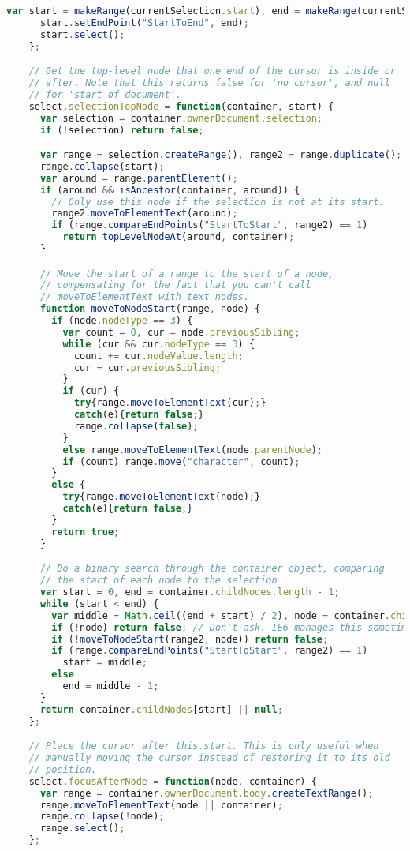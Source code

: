 \begin{lstlisting}[language=Javascript]
      var start = makeRange(currentSelection.start), end = makeRange(currentSelection.end);
      start.setEndPoint("StartToEnd", end);
      start.select();
    };

    // Get the top-level node that one end of the cursor is inside or
    // after. Note that this returns false for 'no cursor', and null
    // for 'start of document'.
    select.selectionTopNode = function(container, start) {
      var selection = container.ownerDocument.selection;
      if (!selection) return false;

      var range = selection.createRange(), range2 = range.duplicate();
      range.collapse(start);
      var around = range.parentElement();
      if (around && isAncestor(container, around)) {
        // Only use this node if the selection is not at its start.
        range2.moveToElementText(around);
        if (range.compareEndPoints("StartToStart", range2) == 1)
          return topLevelNodeAt(around, container);
      }

      // Move the start of a range to the start of a node,
      // compensating for the fact that you can't call
      // moveToElementText with text nodes.
      function moveToNodeStart(range, node) {
        if (node.nodeType == 3) {
          var count = 0, cur = node.previousSibling;
          while (cur && cur.nodeType == 3) {
            count += cur.nodeValue.length;
            cur = cur.previousSibling;
          }
          if (cur) {
            try{range.moveToElementText(cur);}
            catch(e){return false;}
            range.collapse(false);
          }
          else range.moveToElementText(node.parentNode);
          if (count) range.move("character", count);
        }
        else {
          try{range.moveToElementText(node);}
          catch(e){return false;}
        }
        return true;
      }

      // Do a binary search through the container object, comparing
      // the start of each node to the selection
      var start = 0, end = container.childNodes.length - 1;
      while (start < end) {
        var middle = Math.ceil((end + start) / 2), node = container.childNodes[middle];
        if (!node) return false; // Don't ask. IE6 manages this sometimes.
        if (!moveToNodeStart(range2, node)) return false;
        if (range.compareEndPoints("StartToStart", range2) == 1)
          start = middle;
        else
          end = middle - 1;
      }
      return container.childNodes[start] || null;
    };

    // Place the cursor after this.start. This is only useful when
    // manually moving the cursor instead of restoring it to its old
    // position.
    select.focusAfterNode = function(node, container) {
      var range = container.ownerDocument.body.createTextRange();
      range.moveToElementText(node || container);
      range.collapse(!node);
      range.select();
    };


\end{lstlisting}
